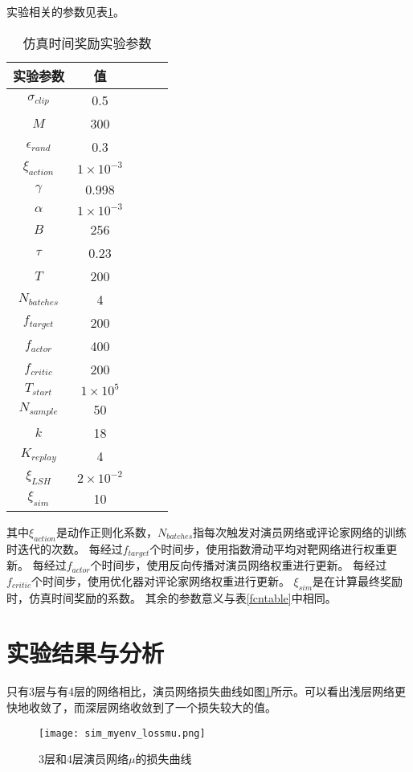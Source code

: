 实验相关的参数见表\ref{simtable}。
    \begin{table}[htbp]
        \caption{仿真时间奖励实验参数}
        \label{simtable}
    \vspace{0.5em}\centering\wuhao
    \begin{tabular}{ccccc}
    \toprule[1.5pt]
    实验参数 & 值\\
    \midrule[1pt]
        $\sigma_{clip}$ & 0.5\\
        $M$ & 300\\
        $\epsilon_{rand}$ & 0.3\\
        $\xi_{action}$ & $1\times 10^{-3}$\\
        $\gamma$ & 0.998\\
        $\alpha$ & $1\times 10^{-3}$\\
        $B$ & 256\\
        $\tau$ & 0.23\\
        $T$ & 200\\
        $N_{batches}$ & 4\\
        $f_{target}$ & 200\\
        $f_{actor}$ & 400\\
        $f_{critic}$ & 200\\
        $T_{start}$ & $1\times 10^5$\\
        $N_{sample}$ & 50 \\
        $k$ & 18\\
        $K_{replay}$ & 4\\
        $\xi_{LSH}$ & $2\times 10^{-2}$\\
        $\xi_{sim}$ & 10\\
    \bottomrule[1.5pt]
    \end{tabular}
    \end{table}
    其中$\xi_{action}$是动作正则化系数，$N_{batches}$指每次触发对演员网络或评论家网络的训练时迭代的次数。
    每经过$f_{target}$个时间步，使用指数滑动平均对靶网络进行权重更新。
    每经过$f_{actor}$个时间步，使用反向传播对演员网络权重进行更新。
    每经过$f_{critic}$个时间步，使用优化器对评论家网络权重进行更新。
    $\xi_{sim}$是在计算最终奖励时，仿真时间奖励的系数。
    其余的参数意义与表\ref{fcntable}中相同。
\section{实验结果与分析}

只有3层与有4层的网络相比，演员网络损失曲线如图\ref{simlossmu}所示。可以看出浅层网络更快地收敛了，而深层网络收敛到了一个损失较大的值。
        \begin{figure}
        \centering
        \texttt{[image: sim\_myenv\_lossmu.png]}
        \caption{3层和4层演员网络$\mu$的损失曲线}
            \label{simlossmu}
        \end{figure}

